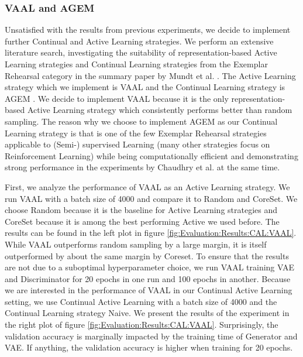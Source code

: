 \subsubsection{VAAL and AGEM}
\label{sec:Evaluation:Results:CAL:VAAL_AGEM}
Unsatisfied with the results from previous experiments, we decide to implement further Continual and Active Learning strategies. We perform an extensive literature search, investigating the suitability of representation-based Active Learning strategies and Continual Learning
strategies from the Exemplar Rehearsal category in the summary paper by Mundt et al. \cite{mundt2020wholistic}. The Active Learning strategy which we implement is VAAL \cite{sinha2019variational} and the Continual Learning strategy is AGEM \cite{chaudhry2019continual}. We decide
to implement VAAL because it is the only representation-based Active Learning strategy which consistently performs better than random sampling. The reason why we choose to implement AGEM as our Continual Learning strategy is that is one of the few Exemplar Rehearsal strategies
applicable to (Semi-) supervised Learning (many other strategies focus on Reinforcement Learning) while being computationally efficient and demonstrating strong performance in the experiments by Chaudhry et al. \cite{chaudhry2019continual} at the same time. \par
First, we analyze the performance of VAAL as an Active Learning strategy. We run VAAL with a batch size of 4000 and compare it to Random and CoreSet. We choose Random because it is the baseline for Active Learning strategies and CoreSet because it is among the best performing Active
we used before. The results can be found in the left plot in figure \ref{fig:Evaluation:Results:CAL:VAAL}. While VAAL outperforms random sampling by a large margin, it is itself outperformed by about the same margin by Coreset. To ensure that the results are not due to a
suboptimal hyperparameter choice, we run VAAL training VAE and Discriminator for 20 epochs in one run and 100 epochs in another. Because we are interested in the performance of VAAL in our Continual Active Learning setting, we use Continual Active Learning with a batch size of 4000
and the Continual Learning strategy Naive. We present the results of the experiment in the right plot of figure \ref{fig:Evaluation:Results:CAL:VAAL}. Surprisingly, the validation accuracy is marginally impacted by the training time of Generator and VAE. If anything, the validation
accuracy is higher when training for 20 epochs. \par


